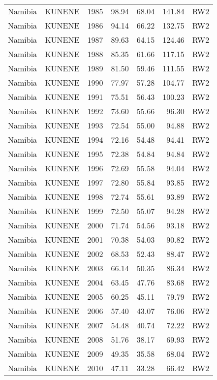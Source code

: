 \begin{longtable}{lllrrrl}
  Namibia & KUNENE & 1985 & 98.94 & 68.04 & 141.84 & RW2 \\ 
  Namibia & KUNENE & 1986 & 94.14 & 66.22 & 132.75 & RW2 \\ 
  Namibia & KUNENE & 1987 & 89.63 & 64.15 & 124.46 & RW2 \\ 
  Namibia & KUNENE & 1988 & 85.35 & 61.66 & 117.15 & RW2 \\ 
  Namibia & KUNENE & 1989 & 81.50 & 59.46 & 111.55 & RW2 \\ 
  Namibia & KUNENE & 1990 & 77.97 & 57.28 & 104.77 & RW2 \\ 
  Namibia & KUNENE & 1991 & 75.51 & 56.43 & 100.23 & RW2 \\ 
  Namibia & KUNENE & 1992 & 73.60 & 55.66 & 96.30 & RW2 \\ 
  Namibia & KUNENE & 1993 & 72.54 & 55.00 & 94.88 & RW2 \\ 
  Namibia & KUNENE & 1994 & 72.16 & 54.48 & 94.41 & RW2 \\ 
  Namibia & KUNENE & 1995 & 72.38 & 54.84 & 94.84 & RW2 \\ 
  Namibia & KUNENE & 1996 & 72.69 & 55.58 & 94.04 & RW2 \\ 
  Namibia & KUNENE & 1997 & 72.80 & 55.84 & 93.85 & RW2 \\ 
  Namibia & KUNENE & 1998 & 72.74 & 55.61 & 93.89 & RW2 \\ 
  Namibia & KUNENE & 1999 & 72.50 & 55.07 & 94.28 & RW2 \\ 
  Namibia & KUNENE & 2000 & 71.74 & 54.56 & 93.18 & RW2 \\ 
  Namibia & KUNENE & 2001 & 70.38 & 54.03 & 90.82 & RW2 \\ 
  Namibia & KUNENE & 2002 & 68.53 & 52.43 & 88.47 & RW2 \\ 
  Namibia & KUNENE & 2003 & 66.14 & 50.35 & 86.34 & RW2 \\ 
  Namibia & KUNENE & 2004 & 63.45 & 47.76 & 83.68 & RW2 \\ 
  Namibia & KUNENE & 2005 & 60.25 & 45.11 & 79.79 & RW2 \\ 
  Namibia & KUNENE & 2006 & 57.40 & 43.07 & 76.06 & RW2 \\ 
  Namibia & KUNENE & 2007 & 54.48 & 40.74 & 72.22 & RW2 \\ 
  Namibia & KUNENE & 2008 & 51.76 & 38.17 & 69.93 & RW2 \\ 
  Namibia & KUNENE & 2009 & 49.35 & 35.58 & 68.04 & RW2 \\ 
  Namibia & KUNENE & 2010 & 47.11 & 33.28 & 66.42 & RW2 \\ 

\end{longtable}
